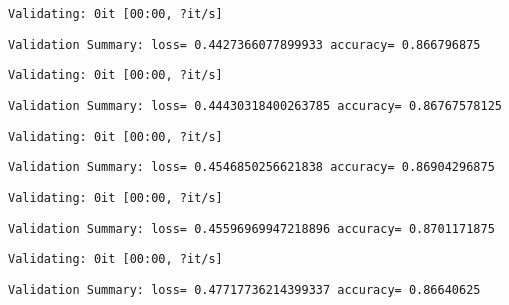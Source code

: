 \documentclass[11pt]{article}
\begin{document}
    
    \begin{Verbatim}[commandchars=\\\{\}]
Validating: 0it [00:00, ?it/s]
    \end{Verbatim}

    
    \begin{Verbatim}[commandchars=\\\{\}]
Validation Summary: loss= 0.4427366077899933 accuracy= 0.866796875
    \end{Verbatim}

    
    \begin{Verbatim}[commandchars=\\\{\}]
Validating: 0it [00:00, ?it/s]
    \end{Verbatim}

    
    \begin{Verbatim}[commandchars=\\\{\}]
Validation Summary: loss= 0.44430318400263785 accuracy= 0.86767578125
    \end{Verbatim}

    
    \begin{Verbatim}[commandchars=\\\{\}]
Validating: 0it [00:00, ?it/s]
    \end{Verbatim}

    
    \begin{Verbatim}[commandchars=\\\{\}]
Validation Summary: loss= 0.4546850256621838 accuracy= 0.86904296875
    \end{Verbatim}

    
    \begin{Verbatim}[commandchars=\\\{\}]
Validating: 0it [00:00, ?it/s]
    \end{Verbatim}

    
    \begin{Verbatim}[commandchars=\\\{\}]
Validation Summary: loss= 0.45596969947218896 accuracy= 0.8701171875
    \end{Verbatim}

    
    \begin{Verbatim}[commandchars=\\\{\}]
Validating: 0it [00:00, ?it/s]
    \end{Verbatim}

    
    \begin{Verbatim}[commandchars=\\\{\}]
Validation Summary: loss= 0.47717736214399337 accuracy= 0.86640625
    \end{Verbatim}
\end{document}
